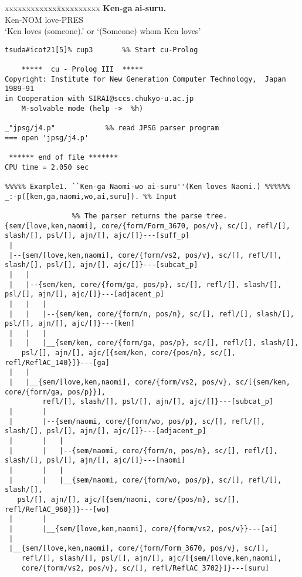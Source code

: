 \begin{tabbing}
xxxxxxxxxxxx\=xxxxxxxxxx\kill
{\bf Ken-ga} \> {\bf ai-suru.}\\
{\sf Ken-NOM} \> {\sf love-PRES}\\
`Ken loves (someone).' or `(Someone) whom Ken loves'
\end{tabbing}

\programskip
{\footnotesize
\begin{verbatim}
tsuda#icot21[5]% cup3		%% Start cu-Prolog

	*****  cu - Prolog III  *****
Copyright: Institute for New Generation Computer Technology,  Japan 1989-91
in Cooperation with SIRAI@sccs.chukyo-u.ac.jp
	M-solvable mode	(help ->  %h)

_"jpsg/j4.p"			%% read JPSG parser program
=== open 'jpsg/j4.p'

 ****** end of file ******* 
CPU time = 2.050 sec

%%%%% Example1. ``Ken-ga Naomi-wo ai-suru''(Ken loves Naomi.) %%%%%%
_:-p([ken,ga,naomi,wo,ai,suru]). %% Input

				%% The parser returns the parse tree.
{sem/[love,ken,naomi], core/{form/Form_3670, pos/v}, sc/[], refl/[], slash/[], psl/[], ajn/[], ajc/[]}---[suff_p]
 | 
 |--{sem/[love,ken,naomi], core/{form/vs2, pos/v}, sc/[], refl/[], slash/[], psl/[], ajn/[], ajc/[]}---[subcat_p]
 |   | 
 |   |--{sem/ken, core/{form/ga, pos/p}, sc/[], refl/[], slash/[], psl/[], ajn/[], ajc/[]}---[adjacent_p]
 |   |   | 
 |   |   |--{sem/ken, core/{form/n, pos/n}, sc/[], refl/[], slash/[], psl/[], ajn/[], ajc/[]}---[ken]
 |   |   | 
 |   |   |__{sem/ken, core/{form/ga, pos/p}, sc/[], refl/[], slash/[],
    psl/[], ajn/[], ajc/[{sem/ken, core/{pos/n}, sc/[], refl/ReflAC_140}]}---[ga]
 |   | 
 |   |__{sem/[love,ken,naomi], core/{form/vs2, pos/v}, sc/[{sem/ken, core/{form/ga, pos/p}}], 
         refl/[], slash/[], psl/[], ajn/[], ajc/[]}---[subcat_p]
 |       | 
 |       |--{sem/naomi, core/{form/wo, pos/p}, sc/[], refl/[], slash/[], psl/[], ajn/[], ajc/[]}---[adjacent_p]
 |       |   | 
 |       |   |--{sem/naomi, core/{form/n, pos/n}, sc/[], refl/[], slash/[], psl/[], ajn/[], ajc/[]}---[naomi]
 |       |   | 
 |       |   |__{sem/naomi, core/{form/wo, pos/p}, sc/[], refl/[], slash/[], 
   psl/[], ajn/[], ajc/[{sem/naomi, core/{pos/n}, sc/[], refl/ReflAC_960}]}---[wo]
 |       | 
 |       |__{sem/[love,ken,naomi], core/{form/vs2, pos/v}}---[ai]
 | 
 |__{sem/[love,ken,naomi], core/{form/Form_3670, pos/v}, sc/[],
    refl/[], slash/[], psl/[], ajn/[], ajc/[{sem/[love,ken,naomi],
    core/{form/vs2, pos/v}, sc/[], refl/ReflAC_3702}]}---[suru]


\end{verbatim}}
